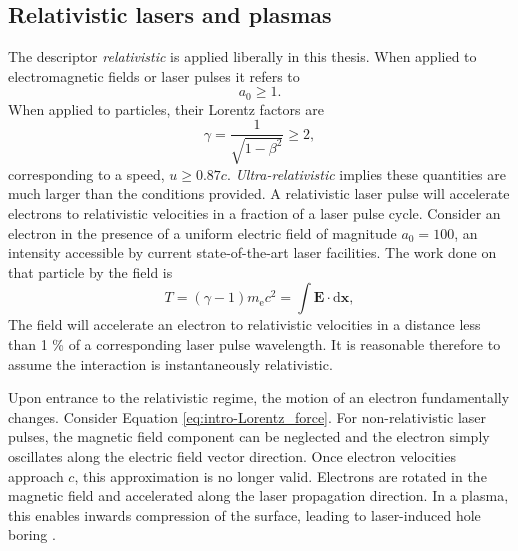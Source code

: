 \subsection{Relativistic lasers and plasmas}
The descriptor \textit{relativistic} is applied liberally in this thesis. When applied to electromagnetic fields or laser pulses it refers to 
\begin{equation}
	a_0 \ge 1.
\end{equation}
When applied to particles, their Lorentz factors are
\begin{equation}
	\gamma = \frac{1}{\sqrt{1-\beta^2}} \ge 2,
\end{equation}
corresponding to a speed, $u \ge 0.87 c$. \textit{Ultra-relativistic} implies these quantities are much larger than the conditions provided. A relativistic laser pulse will accelerate electrons to relativistic velocities in a fraction of a laser pulse cycle. Consider an electron in the presence of a uniform electric field of magnitude $a_0 = 100$, an intensity accessible by current state-of-the-art laser facilities. The work done on that particle by the field is 
\begin{equation}
	T = (\gamma -1)m_\mathrm{e}c^2 = \int \mathbf{E}\cdot \mathrm{d} \mathbf{x},
\end{equation}
The field will accelerate an electron to relativistic velocities in a distance less than 1 \% of a corresponding laser pulse wavelength. It is reasonable therefore to assume the interaction is instantaneously relativistic.

Upon entrance to the relativistic regime, the motion of an electron fundamentally changes. Consider Equation \ref{eq:intro-Lorentz_force}. For non-relativistic laser pulses, the magnetic field component can be neglected and the electron simply oscillates along the electric field vector direction. Once electron velocities approach $c$, this approximation is no longer valid. Electrons are rotated in the magnetic field and accelerated along the laser propagation direction. In a plasma, this enables inwards compression of the surface, leading to laser-induced hole boring \cite{wilksAbsorptionUltraIntenseLaser1992}.

